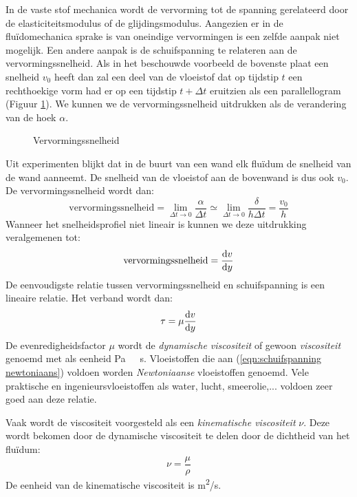 In de vaste stof mechanica wordt de vervorming tot de spanning gerelateerd door de elasticiteitsmodulus of de glijdingsmodulus. Aangezien er in de fluïdomechanica sprake is van oneindige vervormingen is een zelfde aanpak niet mogelijk. Een andere aanpak is de schuifspanning te relateren aan de vervormingssnelheid. Als in het beschouwde voorbeeld de bovenste plaat een snelheid $v_0$ heeft dan zal een deel van de vloeistof dat op tijdstip $t$ een rechthoekige vorm had er op een tijdstip $t+\Delta t$ eruitzien als een parallellogram (Figuur \ref{fig:Vervormingssnelheid}). We kunnen we de vervormingssnelheid uitdrukken als de verandering van de hoek $\alpha$.
\begin{figure}[htb]
	\centering
	
	\caption{Vervormingssnelheid}
	\label{fig:Vervormingssnelheid}
\end{figure}
Uit experimenten blijkt dat in de buurt van een wand elk fluïdum de snelheid van de wand aanneemt. De snelheid van de vloeistof aan de bovenwand is dus ook $v_0$. De vervormingssnelheid wordt dan:
\begin{equation}
	\text{vervormingssnelheid} = \lim_{\Delta t \to 0} \frac{\alpha}{\Delta t} \simeq \lim_{\Delta t \to 0} \frac{\delta}{h \Delta t} = \frac{v_0}{h}
\end{equation}
Wanneer het snelheidsprofiel niet lineair is kunnen we deze uitdrukking veralgemenen tot:
\begin{equation}
	\text{vervormingssnelheid} = \frac{\mathrm{d} v}{\mathrm{d} y}
\end{equation}
De eenvoudigste relatie tussen vervormingssnelheid en schuifspanning is een lineaire relatie. Het verband wordt dan:
\begin{equation}
	\tau = \mu \frac{\mathrm{d} v}{\mathrm{d} y}
	\label{eqn:schuifspanning newtoniaans}
\end{equation}
De evenredigheidsfactor $\mu$ wordt de \emph{dynamische viscositeit} of gewoon \emph{viscositeit} genoemd met als eenheid \unit{Pa\ s}. Vloeistoffen die aan (\ref{eqn:schuifspanning newtoniaans}) voldoen worden \emph{Newtoniaanse} vloeistoffen genoemd. Vele praktische en ingenieursvloeistoffen als water, lucht, smeerolie,... voldoen zeer goed aan deze relatie.

Vaak wordt de viscositeit voorgesteld als een \emph{kinematische viscositeit} $\nu$. Deze wordt bekomen door de dynamische viscositeit te delen door de dichtheid van het fluïdum:
\begin{equation}
	\nu = \frac{\mu}{\rho}
\end{equation}
De eenheid van de kinematische viscositeit is \unit{m^2/s}.

